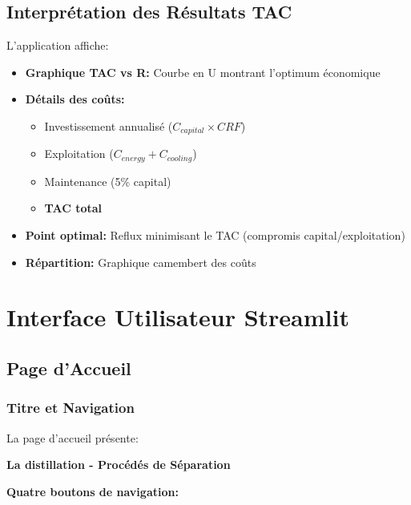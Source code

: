 \documentclass[11pt,a4paper]{article}
\begin{document}
\subsection{Interprétation des Résultats TAC}

L'application affiche:

\begin{itemize}[leftmargin=*]
    \item \textbf{Graphique TAC vs R:} Courbe en U montrant l'optimum économique
    \item \textbf{Détails des coûts:}
    \begin{itemize}
        \item Investissement annualisé ($C_{capital} \times CRF$)
        \item Exploitation ($C_{energy} + C_{cooling}$)
        \item Maintenance (5\% capital)
        \item \textbf{TAC total}
    \end{itemize}
    \item \textbf{Point optimal:} Reflux minimisant le TAC (compromis capital/exploitation)
    \item \textbf{Répartition:} Graphique camembert des coûts
\end{itemize}

\section{Interface Utilisateur Streamlit}

\subsection{Page d'Accueil}

\subsubsection{Titre et Navigation}

La page d'accueil présente:

\begin{tcolorbox}[colback=blue!5,colframe=blue!50!black,title=Titre Principal (Version 2.2)]
\textbf{La distillation - Procédés de Séparation}
\end{tcolorbox}

\textbf{Quatre boutons de navigation:}
\end{document}
